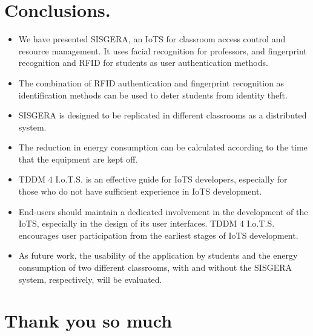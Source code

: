 \documentclass[]{scrartcl}
\begin{document}
\section*{Conclusions.}
		\begin{itemize}
			\item We have presented SISGERA, an IoTS for classroom access control and resource management. It uses facial recognition for professors, and fingerprint recognition and RFID for students as user authentication methods.
			\item The combination of RFID authentication and fingerprint recognition as identification methods can be used to deter students from identity theft.
			\item SISGERA is designed to be replicated in different classrooms as a distributed system.
			\item The reduction in energy consumption can be calculated according to the time that the equipment are kept off.
			\item TDDM 4 I.o.T.S. is an effective guide for IoTS developers, especially for those who do not have sufficient experience in IoTS development.
			\item End-users should maintain a dedicated involvement in the development of the IoTS, especially in the design of its user interfaces. TDDM 4 I.o.T.S. encourages user participation from the earliest stages of IoTS development.
			\item As future work, the usability of the application by students and the energy consumption of two different classrooms, with and without the SISGERA system, respectively, will be evaluated.
		\end{itemize}

\section*{Thank you so much}
\end{document}
